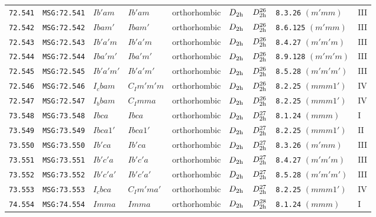 \documentclass[fleqn,10pt]{jsarticle}
\begin{document}
\begin{center}
\begin{longtable}{lllllllll}
\texttt{72.541} & \texttt{MSG:72.541} & $Ib'am$ & $Ib'am$ & orthorhombic & $D_{\rm 2h}$ & $D_{\rm 2h}^{26}$ & \texttt{8.3.26} $(m'mm)$ & III \\
\texttt{72.542} & \texttt{MSG:72.542} & $Ibam'$ & $Ibam'$ & orthorhombic & $D_{\rm 2h}$ & $D_{\rm 2h}^{26}$ & \texttt{8.6.125} $(m'mm)$ & III \\
\texttt{72.543} & \texttt{MSG:72.543} & $Ib'a'm$ & $Ib'a'm$ & orthorhombic & $D_{\rm 2h}$ & $D_{\rm 2h}^{26}$ & \texttt{8.4.27} $(m'm'm)$ & III \\
\texttt{72.544} & \texttt{MSG:72.544} & $Iba'm'$ & $Iba'm'$ & orthorhombic & $D_{\rm 2h}$ & $D_{\rm 2h}^{26}$ & \texttt{8.9.128} $(m'm'm)$ & III \\
\texttt{72.545} & \texttt{MSG:72.545} & $Ib'a'm'$ & $Ib'a'm'$ & orthorhombic & $D_{\rm 2h}$ & $D_{\rm 2h}^{26}$ & \texttt{8.5.28} $(m'm'm')$ & III \\
\texttt{72.546} & \texttt{MSG:72.546} & $I_{c}bam$ & $C_{I}m'm'm$ & orthorhombic & $D_{\rm 2h}$ & $D_{\rm 2h}^{26}$ & \texttt{8.2.25} $(mmm1')$ & IV \\
\texttt{72.547} & \texttt{MSG:72.547} & $I_{b}bam$ & $C_{I}mma$ & orthorhombic & $D_{\rm 2h}$ & $D_{\rm 2h}^{26}$ & \texttt{8.2.25} $(mmm1')$ & IV \\ \hline
\texttt{73.548} & \texttt{MSG:73.548} & $Ibca$ & $Ibca$ & orthorhombic & $D_{\rm 2h}$ & $D_{\rm 2h}^{27}$ & \texttt{8.1.24} $(mmm)$ & I \\
\texttt{73.549} & \texttt{MSG:73.549} & $Ibca1'$ & $Ibca1'$ & orthorhombic & $D_{\rm 2h}$ & $D_{\rm 2h}^{27}$ & \texttt{8.2.25} $(mmm1')$ & II \\
\texttt{73.550} & \texttt{MSG:73.550} & $Ib'ca$ & $Ib'ca$ & orthorhombic & $D_{\rm 2h}$ & $D_{\rm 2h}^{27}$ & \texttt{8.3.26} $(m'mm)$ & III \\
\texttt{73.551} & \texttt{MSG:73.551} & $Ib'c'a$ & $Ib'c'a$ & orthorhombic & $D_{\rm 2h}$ & $D_{\rm 2h}^{27}$ & \texttt{8.4.27} $(m'm'm)$ & III \\
\texttt{73.552} & \texttt{MSG:73.552} & $Ib'c'a'$ & $Ib'c'a'$ & orthorhombic & $D_{\rm 2h}$ & $D_{\rm 2h}^{27}$ & \texttt{8.5.28} $(m'm'm')$ & III \\
\texttt{73.553} & \texttt{MSG:73.553} & $I_{c}bca$ & $C_{I}m'ma'$ & orthorhombic & $D_{\rm 2h}$ & $D_{\rm 2h}^{27}$ & \texttt{8.2.25} $(mmm1')$ & IV \\ \hline
\texttt{74.554} & \texttt{MSG:74.554} & $Imma$ & $Imma$ & orthorhombic & $D_{\rm 2h}$ & $D_{\rm 2h}^{28}$ & \texttt{8.1.24} $(mmm)$ & I \\

\end{longtable}
\end{center}
\end{document}
